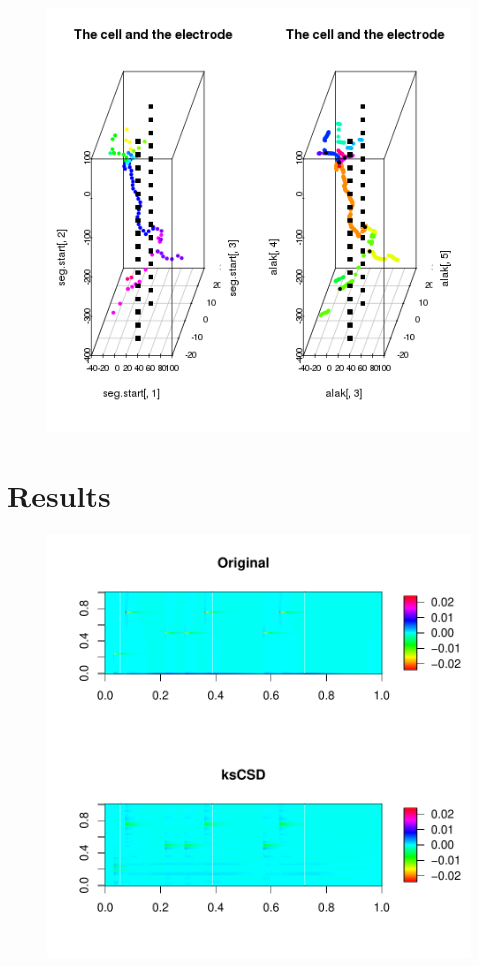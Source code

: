 \documentclass[11pt,a4paper,titlepage]{beamer}
\begin{document}

\begin{frame}
\begin{figure}
\includegraphics[height=6.8 cm]{plots/moprhology3d.png}
\end{figure}

\end{frame}

\section{Results}




\begin{frame}
\begin{figure}
\includegraphics[height=9 cm]{plots/pl-kCSDplot.pdf}
\end{figure}

\end{frame}
\end{document}
